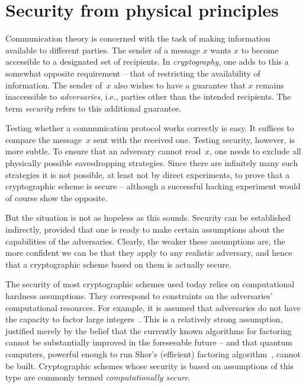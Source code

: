 \section{Security from physical principles}
\label{sec:intro}

Communication theory is concerned with the task of making information
available to different parties. The sender of a message $x$ wants
$x$ to become accessible to a designated set of recipients. In
\emph{cryptography}, one adds to this a somewhat opposite requirement
\--- that of restricting the availability of information. The sender
of~$x$ also wishes to have a guarantee that $x$ remains inaccessible
to \emph{adversaries}, i.e., parties other than the intended recipients.
The term \emph{security} refers to this additional guarantee.

Testing whether a communication protocol works correctly is easy. It
suffices to compare the message~$x$ sent with the received
one. Testing security, however, is more subtle. To ensure that an
adversary cannot read~$x$, one needs to exclude all physically
possible eavesdropping strategies.  Since there are infinitely many such strategies it is not possible, at least not by direct experiments, to prove  that a cryptographic scheme is secure \---
although a successful hacking experiment would of course show the
opposite.

But the situation is not as hopeless as this sounds. Security can be established indirectly, provided that one is ready to make certain assumptions about the capabilities of the adversaries. Clearly, the weaker these assumptions are, the more confident we can be that they apply to any realistic adversary, and hence that a cryptographic scheme based on them is actually secure. %

The security of most cryptographic schemes used today relies on computational hardness assumptions. They correspond to constraints on the adversaries' computational resources. For example, it is assumed that adversaries do not have the capacity to factor large integers~\cite{RSA78}. This is a relatively strong assumption, justified merely by the belief that the currently known algorithms for factoring cannot be substantially improved in the foreseeable future \--- and that  quantum computers, powerful enough to run Shor's (efficient) factoring algorithm~\cite{Shor97}, cannot be built. Cryptographic schemes whose security is based on assumptions of this type are commonly termed \emph{computationally secure}.

